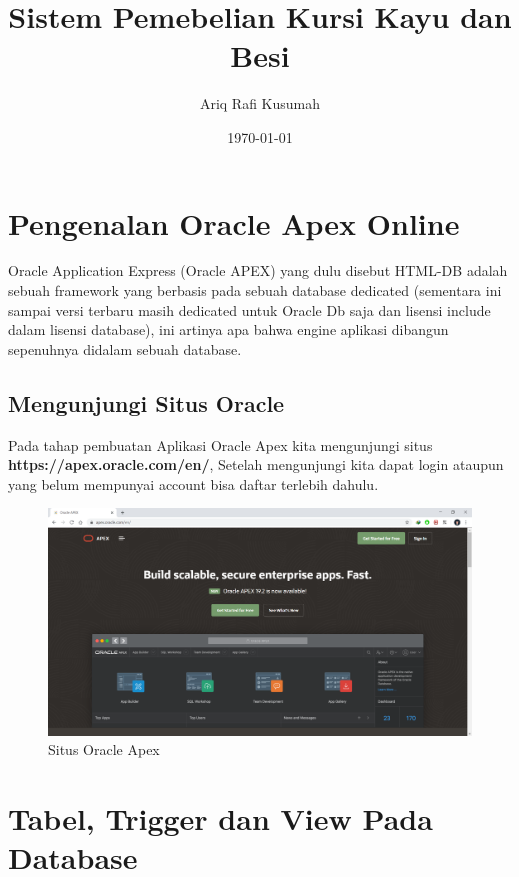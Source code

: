 \documentclass[12pt, a4paper]{report}
\title{Sistem Pemebelian Kursi Kayu dan Besi }
\author{Ariq Rafi Kusumah }
\date{\today}
\begin{document}
\maketitle

\chapter{Pengenalan Oracle Apex Online}

Oracle Application Express (Oracle APEX) yang dulu disebut HTML-DB adalah sebuah framework yang berbasis pada sebuah database dedicated (sementara ini sampai versi terbaru masih dedicated untuk Oracle Db saja dan lisensi include dalam lisensi database), ini artinya apa bahwa engine aplikasi dibangun sepenuhnya didalam sebuah database.

\section{Mengunjungi Situs Oracle}

Pada tahap pembuatan Aplikasi Oracle Apex kita mengunjungi situs \\ \textbf{https://apex.oracle.com/en/}, Setelah mengunjungi kita dapat login ataupun yang belum mempunyai account bisa daftar terlebih dahulu.

\begin{figure}[h]
    \centering
    \includegraphics[scale=0.3]{figures/1.png}
    \caption{Situs Oracle Apex}
    \label{fig:my_label}
\end{figure}



\chapter{Tabel, Trigger dan View Pada Database}
\end{document}
